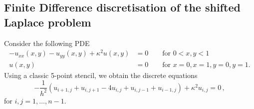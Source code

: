 \documentclass[
fontsize=11pt,
paper=a4,
numbers=noenddot
]{scrartcl}
\begin{document}
\subsection{Finite Difference discretisation of the shifted Laplace problem}
Consider the following PDE
\begin{align*}
    -u_{xx}(x,y) - u_{yy}(x,y) + \kappa^2 u(x,y) &= 0 \qquad \text{for $0 < x,y < 1$} \\
    u(x,y) &= 0 \qquad \text{for $x = 0, x = 1, y = 0, y = 1$.}
\end{align*}
Using a classic 5-point stencil, we obtain the discrete equations
\begin{equation*}
    -\frac{1}{h^2}\left(
        u_{i+1,j} + u_{i,j+1} - 4u_{i,j} + u_{i,j-1} + u_{i-1,j}
    \right)
    + \kappa^2 u_{i,j} = 0\,,
\end{equation*}
for $i,j = 1,\dotsc,n-1$.

\printbibliography
\end{document}
